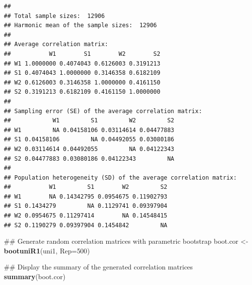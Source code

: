 \documentclass[]{article}
\newenvironment{Shaded}{\begin{snugshade}}{\end{snugshade}}
\newcommand{\KeywordTok}[1]{\textcolor[rgb]{0.13,0.29,0.53}{\textbf{#1}}}
\newcommand{\DataTypeTok}[1]{\textcolor[rgb]{0.13,0.29,0.53}{#1}}
\newcommand{\DecValTok}[1]{\textcolor[rgb]{0.00,0.00,0.81}{#1}}
\newcommand{\StringTok}[1]{\textcolor[rgb]{0.31,0.60,0.02}{#1}}
\newcommand{\NormalTok}[1]{#1}
\begin{document}
\begin{verbatim}
## 
## Total sample sizes:  12906
## Harmonic mean of the sample sizes:  12906 
## 
## Average correlation matrix:  
##           W1        S1        W2        S2
## W1 1.0000000 0.4074043 0.6126003 0.3191213
## S1 0.4074043 1.0000000 0.3146358 0.6182109
## W2 0.6126003 0.3146358 1.0000000 0.4161150
## S2 0.3191213 0.6182109 0.4161150 1.0000000
## 
## Sampling error (SE) of the average correlation matrix:  
##            W1         S1         W2         S2
## W1         NA 0.04158106 0.03114614 0.04477883
## S1 0.04158106         NA 0.04492055 0.03080186
## W2 0.03114614 0.04492055         NA 0.04122343
## S2 0.04477883 0.03080186 0.04122343         NA
## 
## Population heterogeneity (SD) of the average correlation matrix:  
##           W1         S1        W2         S2
## W1        NA 0.14342795 0.0954675 0.11902793
## S1 0.1434279         NA 0.1129741 0.09397904
## W2 0.0954675 0.11297414        NA 0.14548415
## S2 0.1190279 0.09397904 0.1454842         NA
\end{verbatim}

\begin{Shaded}
\begin{Highlighting}[]
\NormalTok{## Generate random correlation matrices with parametric bootstrap}
\NormalTok{boot.cor <-}\StringTok{ }\KeywordTok{bootuniR1}\NormalTok{(uni1, }\DataTypeTok{Rep=}\DecValTok{500}\NormalTok{)}

\NormalTok{## Display the summary of the generated correlation matrices}
\KeywordTok{summary}\NormalTok{(boot.cor)}
\end{Highlighting}
\end{Shaded}
\end{document}
